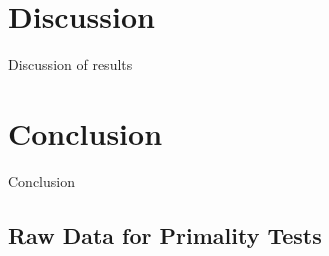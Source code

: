 \documentclass{article}
\begin{document}
\section{Discussion}
Discussion of results

\section{Conclusion}
Conclusion

\nocite{*}



\appendix
\begin{appendices}
\section{Raw Data for Primality Tests}


\end{appendices}
\end{document}
